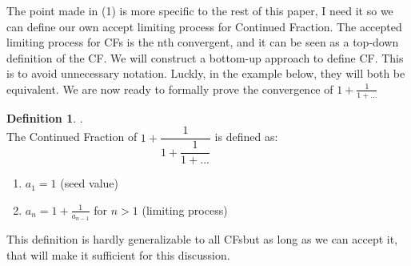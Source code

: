 \documentclass[psamsfonts]{amsart}
\theoremstyle{definition}
\newtheorem{defn}[thm]{Definition}
\theoremstyle{remark}
\numberwithin{equation}{section}
\begin{document}
The point made in (1) is more specific to the rest of this paper, I need it so we can define our own accept limiting process for Continued Fraction. The accepted limiting process for CFs is the nth convergent, and it can be seen as a top-down definition of the CF. We will construct a bottom-up approach to define CF. This is to avoid unnecessary notation. Luckly, in the example below, they will both be equivalent. We are now ready to formally prove the convergence of $1+\frac{1}{1+...}$

\begin{defn} .\\
The Continued Fraction of $1+\dfrac{1}{1+ \dfrac{1}{1+...}}$ is defined as: \\
\begin{enumerate}
    \item $a_1=1$ (seed value)
    \item $a_n = 1+ \frac{1}{a_{n-1}}$ for $n>1$ (limiting process)
\end{enumerate}
This definition is hardly generalizable to all CFs\footnotemark  but as long as we can accept it, that will make it sufficient for this discussion. 

\end{defn}


\end{document}
